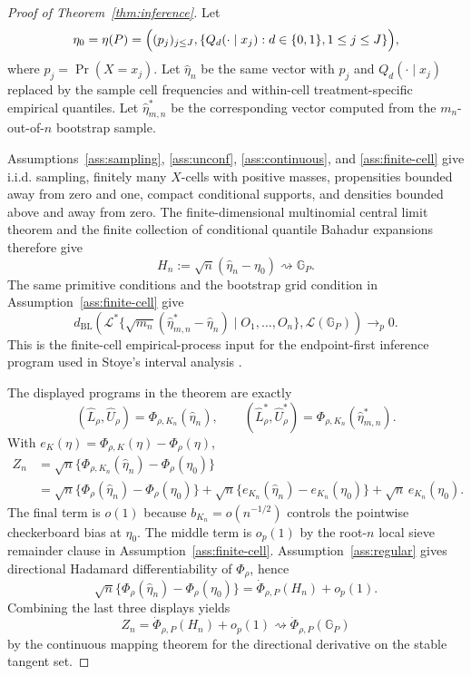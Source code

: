 \begin{proof}[Proof of Theorem~\ref{thm:inference}]
Let
\[
\eta_0=\eta(P)=\Bigl((p_j)_{j\le J},\{Q_d(\cdot\mid x_j):d\in\{0,1\},1\le j\le J\}\Bigr),
\]
where \(p_j=\Pr(X=x_j)\).  Let \(\widehat\eta_n\) be the same vector with \(p_j\) and \(Q_d(\cdot\mid x_j)\) replaced by the sample cell frequencies and within-cell treatment-specific empirical quantiles.  Let \(\widehat\eta_{m,n}^*\) be the corresponding vector computed from the \(m_n\)-out-of-\(n\) bootstrap sample.

Assumptions~\ref{ass:sampling}, \ref{ass:unconf}, \ref{ass:continuous}, and \ref{ass:finite-cell} give i.i.d. sampling, finitely many \(X\)-cells with positive masses, propensities bounded away from zero and one, compact conditional supports, and densities bounded above and away from zero.  The finite-dimensional multinomial central limit theorem and the finite collection of conditional quantile Bahadur expansions therefore give
\[
H_n:=\sqrt n(\widehat\eta_n-\eta_0)\rightsquigarrow\mathbb G_P.
\]
The same primitive conditions and the bootstrap grid condition in Assumption~\ref{ass:finite-cell} give
\[
d_{\mathrm{BL}}\!\left(
\mathcal L^*\{\sqrt{m_n}(\widehat\eta_{m,n}^*-\widehat\eta_n)\mid O_1,\ldots,O_n\},
\mathcal L(\mathbb G_P)
\right)\to_p0.
\]
This is the finite-cell empirical-process input for the endpoint-first inference program used in Stoye's interval analysis \cite{Stoye2009MoreCI}.

The displayed programs in the theorem are exactly
\[
(\widehat L_\rho,\widehat U_\rho)=\Phi_{\rho,K_n}(\widehat\eta_n),
\qquad
(\widehat L_\rho^*,\widehat U_\rho^*)=\Phi_{\rho,K_n}(\widehat\eta_{m,n}^*).
\]
With \(e_K(\eta)=\Phi_{\rho,K}(\eta)-\Phi_\rho(\eta)\),
\[
\begin{aligned}
Z_n
&=\sqrt n\{\Phi_{\rho,K_n}(\widehat\eta_n)-\Phi_\rho(\eta_0)\}\\
&=\sqrt n\{\Phi_\rho(\widehat\eta_n)-\Phi_\rho(\eta_0)\}
+\sqrt n\{e_{K_n}(\widehat\eta_n)-e_{K_n}(\eta_0)\}
+\sqrt n\,e_{K_n}(\eta_0).
\end{aligned}
\]
The final term is \(o(1)\) because \(b_{K_n}=o(n^{-1/2})\) controls the pointwise checkerboard bias at \(\eta_0\).  The middle term is \(o_p(1)\) by the root-\(n\) local sieve remainder clause in Assumption~\ref{ass:finite-cell}.  Assumption~\ref{ass:regular} gives directional Hadamard differentiability of \(\Phi_\rho\), hence
\[
\sqrt n\{\Phi_\rho(\widehat\eta_n)-\Phi_\rho(\eta_0)\}
=\dot\Phi_{\rho,P}(H_n)+o_p(1).
\]
Combining the last three displays yields
\[
Z_n=\dot\Phi_{\rho,P}(H_n)+o_p(1)
\rightsquigarrow \dot\Phi_{\rho,P}(\mathbb G_P)
\]
by the continuous mapping theorem for the directional derivative on the stable tangent set.


\end{proof}
